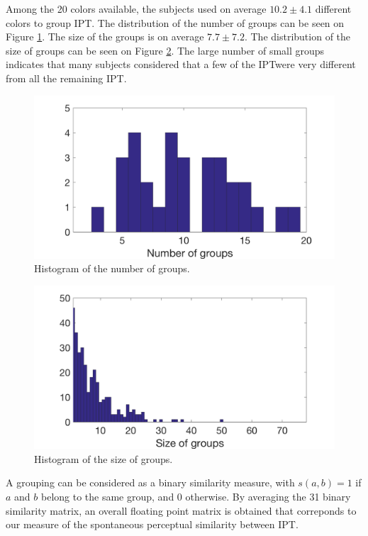 \documentclass{article}
\newcommand{\ipt}{IPT}
\begin{document}
Among the 20 colors available, the subjects used on average $10.2 \pm  4.1$ different colors to group \ipt. The distribution of the number of groups can be seen on Figure \ref{fig:xp2nbGroup}. The size of the groups is on average $7.7 \pm   7.2$. The distribution of the size of groups can be seen on Figure \ref{fig:xp2sizeGroup}. The large number of small groups indicates that many subjects considered that a few of the \ipt were very different from all the remaining \ipt.

\begin{figure}
\center
\includegraphics[width = \textwidth]{figures/nbc.png}
\caption{Histogram of the number of groups.}
\label{fig:xp2nbGroup}
\end{figure}

\begin{figure}
\center
\includegraphics[width = \textwidth]{figures/sbc.png}
\caption{Histogram of the size of groups.}
\label{fig:xp2sizeGroup}
\end{figure}

A grouping can be considered as a binary similarity measure, with $s(a, b) = 1$ if $a$ and $b$ belong to the same group, and $0$ otherwise. By averaging the 31 binary similarity matrix, an overall floating point matrix is obtained that correponds to our measure of the spontaneous perceptual similarity between \ipt.
\end{document}
